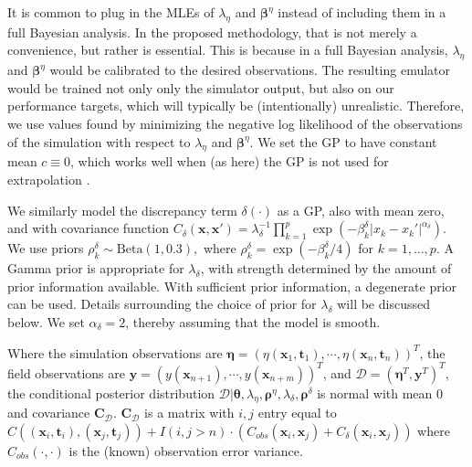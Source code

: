 \documentclass[12pt]{article}
\begin{document}
It is common to plug in the MLEs of $\lambda_\eta$ and $\boldsymbol \beta^\eta$ instead of including them in a full Bayesian analysis.
%
In the proposed methodology, that is not merely a convenience, but rather is essential.
%
This is because in a full Bayesian analysis, $\lambda_\eta$ and $\boldsymbol\beta^\eta$ would be calibrated to the desired observations.
%
The resulting emulator would be trained not only only the simulator output, but also on our performance targets, which will typically be (intentionally) unrealistic.
%
Therefore, we use values found by minimizing the negative log likelihood of the observations of the simulation with respect to $\lambda_\eta$ and $\boldsymbol\beta^\eta$.
%
We set the GP to have constant mean $c\equiv0$, which works well when (as here) the GP is not used for extrapolation \citep{Bayarri2007}.
%

We similarly model the discrepancy term $\delta(\cdot)$ as a GP, also with mean zero, and with covariance function
%
$C_\delta(\mathbf x,\mathbf x') = \lambda_\delta^{-1} \prod_{k=1}^p
\exp\left( -\beta_k^\delta |x_k-x_k'|^{\alpha_\delta} \right).$
%
We use priors
$\rho^\delta_k \sim \mathrm{Beta}(1,0.3),$
where $\rho_k^\delta = \exp(-\beta_k^\delta/4)$ for $k=1,\ldots,p$. 
%
A Gamma prior is appropriate for $\lambda_\delta$, with strength determined by the amount of prior information available. 
%
With sufficient prior information, a degenerate prior can be used. 
%
Details surrounding the choice of prior for $\lambda_\delta$ will be discussed below.
%
We set $\alpha_\delta=2$, thereby assuming that the model is smooth.

Where the simulation observations are $\boldsymbol \eta = (\eta(\mathbf x_1,\mathbf t_1),\cdots,\eta(\mathbf x_n,\mathbf t_n))^T$, the field observations are $\mathbf y = (y(\mathbf x_{n+1}),\cdots,y(\mathbf x_{n+m}))^T$,
and $\mathcal D = (\boldsymbol \eta^T,\mathbf y^T)^T$, the conditional posterior distribution $\mathcal D | \boldsymbol \theta,\lambda_\eta, \boldsymbol \rho^\eta,\lambda_\delta,\boldsymbol \rho^\delta$ is normal with mean 0 and covariance $\mathbf C_\mathcal D$. 
%
$\mathbf C_\mathcal D$ is a matrix with $i,j$ entry equal to 
$
C((\mathbf x_i,\mathbf t_i),(\mathbf x_j,\mathbf t_j)) + I(i,j>n)\cdot(C_{obs}(\mathbf x_i,\mathbf x_j) + C_\delta(\mathbf x_i,\mathbf x_j))
$
where $C_{obs}(\cdot,\cdot)$ is the (known) observation error variance.
%
\end{document}
